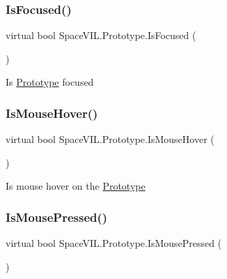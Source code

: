 \subsubsection{\texorpdfstring{Is\+Focused()}{IsFocused()}}
{\footnotesize\ttfamily virtual bool Space\+V\+I\+L.\+Prototype.\+Is\+Focused (\begin{DoxyParamCaption}{ }\end{DoxyParamCaption})\hspace{0.3cm}{\ttfamily [virtual]}}



Is \mbox{\hyperlink{class_space_v_i_l_1_1_prototype}{Prototype}} focused 

\mbox{\label{class_space_v_i_l_1_1_prototype_a6b8dcf54d97cc24aa7ef347bd33f8664}} 
\subsubsection{\texorpdfstring{Is\+Mouse\+Hover()}{IsMouseHover()}}
{\footnotesize\ttfamily virtual bool Space\+V\+I\+L.\+Prototype.\+Is\+Mouse\+Hover (\begin{DoxyParamCaption}{ }\end{DoxyParamCaption})\hspace{0.3cm}{\ttfamily [virtual]}}



Is mouse hover on the \mbox{\hyperlink{class_space_v_i_l_1_1_prototype}{Prototype}} 

\mbox{\label{class_space_v_i_l_1_1_prototype_a0cf4369361d82f9398292f3d727388ab}} 
\subsubsection{\texorpdfstring{Is\+Mouse\+Pressed()}{IsMousePressed()}}
{\footnotesize\ttfamily virtual bool Space\+V\+I\+L.\+Prototype.\+Is\+Mouse\+Pressed (\begin{DoxyParamCaption}{ }\end{DoxyParamCaption})\hspace{0.3cm}{\ttfamily [virtual]}}



